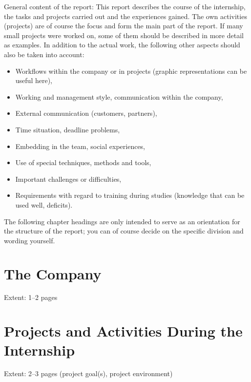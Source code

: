\documentclass[type=internship,theme=fhooe24,language=english,titlelanguage=english,smartquotes]{hgbthesis}
\begin{document}
General content of the report: This report describes the course of the
internship, the tasks and projects carried out and the experiences gained. The
own activities (projects) are of course the focus and form the main part of the
report. If many small projects were worked on, some of them should be described
in more detail as examples. In addition to the actual work, the following other
aspects should also be taken into account:
%
\begin{itemize}
	\item Workflows within the company or in projects (graphic representations
	can be useful here),
	\item Working and management style, communication within the company,
	\item External communication (customers, partners),
	\item Time situation, deadline problems,
	\item Embedding in the team, social experiences,
	\item Use of special techniques, methods and tools,
	\item Important challenges or difficulties,
	\item Requirements with regard to training during studies (knowledge that
	can be used well, deficits).
\end{itemize}
%
The following chapter headings are only intended to serve as an orientation for
the structure of the report; you can of course decide on the specific division
and wording yourself.

\mainmatter                                    %

\chapter{The Company}

Extent: 1--2 pages


\chapter{Projects and Activities During the Internship}

Extent: 2--3 pages (project goal(s), project environment)
\end{document}
